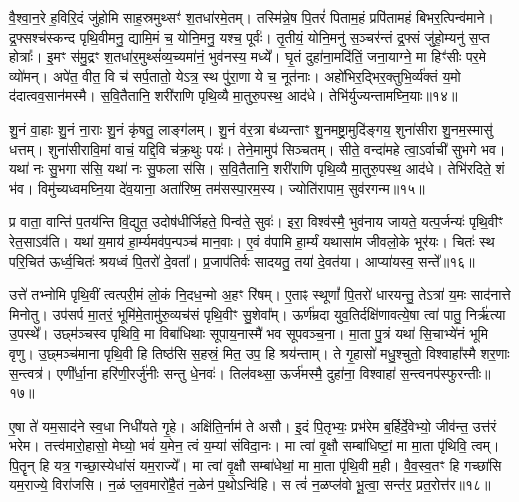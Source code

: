 वै॒श्वा॒न॒रे ह॒विरि॒दं जु॑होमि साह॒स्रमुथ्सꣳ॑ श॒तधा॑रमे॒तम्। 
तस्मि॑न्ने॒ष पि॒तरं॑ पिताम॒हं प्रपि॑तामहं बिभर॒त्पिन्व॑माने। 
द्र॒फ्सश्च॑स्कन्द पृथि॒वीमनु॒ द्यामि॒मं च॒ योनि॒मनु॒ यश्च॒ पूर्वः॑। 
तृ॒तीयं॒ योनि॒मनु॑ स॒ञ्चर॑न्तं द्र॒फ्सं जु॑हो॒म्यनु॑ स॒प्त होत्राः᳚। 
इ॒मꣳ स॑मु॒द्रꣳ श॒तधा॑र॒मुथ्सं॑व्य॒च्यमा॑नं॒ भुव॑नस्य॒ मध्ये᳚। 
घृ॒तं दुहा॑ना॒मदि॑तिं॒ जना॒याग्ने॒ मा हिꣳ॑सीः पर॒मे व्यो॑मन्। 
अपे॑त॒ वीत॒ वि च॑ सर्प॒तातो॒ येऽत्र॒ स्थ पु॑रा॒णा ये च॒ नूत॑नाः। 
अहो॑भिर॒द्भिर॒क्तुभि॒र्व्य॑क्तं य॒मो द॑दात्वव॒सान॑मस्मै। 
स॒वि॒तैतानि॒ शरी॑राणि पृथि॒व्यै मा॒तुरु॒पस्थ॒ आद॑धे। 
तेभि॑र्युज्यन्तामघ्नि॒याः॥१४॥

शु॒नं वा॒हाः  शु॒नं ना॒राः  शु॒नं कृ॑षतु॒ लाङ्ग॑लम्। 
शु॒नं व॑र॒त्रा ब॑ध्यन्ताꣳ शु॒नमष्ट्रा॒मुदि॑ङ्गय॒ शुना॑सीरा शु॒नम॒स्मासु॑ धत्तम्। 
शुना॑सीरावि॒मां वाचं॒ यद्दि॒वि च॑क्र॒थुः पयः॑। 
तेने॒मामुप॑ सिञ्चतम्। 
सीते॒ वन्दा॑महे त्वा॒ऽर्वाची॑ सुभगे भव। 
यथा॑ नः सु॒भगा स॑सि॒ यथा॑ नः सु॒फला स॑सि। 
स॒वि॒तैतानि॒ शरी॑राणि पृथि॒व्यै मा॒तुरु॒पस्थ॒ आद॑धे। 
तेभि॑रदिते॒ शं भ॑व। 
विमु॑च्यध्वमघ्नि॒या दे॑व॒याना॒ अता॑रिष्म॒ तम॑सस्पा॒रम॒स्य। 
ज्योति॑रापाम॒ सुव॑रगन्म॥१५॥

प्र वाता॒ वान्ति॑ प॒तय॑न्ति वि॒द्युत॒ उदोष॑धीर्जिहते॒ पिन्व॑ते॒ सुवः॑। 
इरा॒ विश्व॑स्मै॒ भुव॑नाय जायते॒ यत्प॒र्जन्यः॑ पृथि॒वीꣳ रेत॒साऽव॑ति। 
यथा॑ य॒माय॑ हा॒र्म्यमव॑प॒न्पञ्च॑ मान॒वाः। 
ए॒वं व॑पामि हा॒र्म्यं यथासा॑म जीवलो॒के भूर॑यः। 
चितः॑ स्थ परि॒चित॑ ऊर्ध्व॒चितः॑  श्रयध्वं पि॒तरो॑ दे॒वता᳚। 
प्र॒जाप॑तिर्वः सादयतु॒ तया॑ दे॒वत॑या। 
आप्या॑यस्व॒ सन्ते᳚॥१६॥%
\anuvakamend[अ॒घ्नि॒या अ॑गन्म स॒प्त च॑]

उत्ते॑ तभ्नोमि पृथि॒वीं त्वत्परी॒मं लो॒कं नि॒दध॒न्मो अ॒हꣳ रि॑षम्। 
ए॒ताꣴ स्थूणां᳚ पि॒तरो॑ धारयन्तु॒ तेऽत्रा॑ य॒मः साद॑नात्ते मिनोतु। 
उप॑सर्प मा॒तरं॒ भूमि॑मे॒तामु॑रु॒व्यच॑सं पृथि॒वीꣳ सु॒शेवा᳚म्। 
ऊर्ण॑म्रदा युव॒तिर्दक्षि॑णावत्ये॒षा त्वा॑ पातु॒ निर्\mbox{}ऋ॑त्या उ॒पस्थे᳚। 
उछ्म॑ञ्चस्व पृथिवि॒ मा विबा॑धिथाः सूपाय॒नास्मै॑ भव सूपवञ्च॒ना। 
मा॒ता पु॒त्रं यथा॑ सि॒चाभ्ये॑नं भूमि वृणु। 
उ॒छ्मञ्च॑माना पृथि॒वी हि तिष्ठ॑सि स॒हस्रं॒ मित॒ उप॒ हि श्रय॑न्ताम्। 
ते गृ॒हासो॑ मधु॒श्चुतो॒ विश्वाहा᳚स्मै शर॒णाः स॒न्त्वत्र॑। 
एणी᳚र्धा॒ना हरि॑णी॒रर्जु॑नीः सन्तु धे॒नवः॑। 
तिल॑वथ्सा॒ ऊर्ज॑मस्मै॒ दुहा॑ना॒ विश्वाहा॑ स॒न्त्वनप॑स्फुरन्तीः॥१७॥

ए॒षा ते॑ यम॒साद॑ने स्व॒धा निधी॑यते गृ॒हे। 
अक्षि॑ति॒र्नाम॑ ते असौ। 
इ॒दं पि॒तृभ्यः॒ प्रभ॑रेम ब॒र्\mbox{}हिर्दे॒वेभ्यो॒ जीव॑न्त॒ उत्त॑रं भरेम। 
तत्त्व॑मारो॒हासो॒ मेघ्यो॒ भवं॑ य॒मेन॒ त्वं य॒म्या॑ संविदा॒नः। 
मा त्वा॑ वृ॒क्षौ सम्बा॑धिष्टां॒ मा मा॒ता पृ॑थिवि॒ त्वम्। 
पि॒तॄन् हि यत्र॒ गच्छा॒स्येधा॑सं यम॒राज्ये᳚। 
मा त्वा॑ वृ॒क्षौ सम्बा॑धेथां॒ मा मा॒ता पृ॑थि॒वी म॒ही। 
वै॒व॒स्व॒तꣳ हि गच्छा॑सि यम॒राज्ये॒ विरा॑जसि। 
न॒ळं प्ल॒वमारो॑है॒तं न॒ळेन॑ प॒थोऽन्वि॑हि। 
स त्वं॑ न॒ळप्ल॑वो भू॒त्वा॒ सन्त॑र॒ प्रत॒रोत्त॑र॥१८॥

